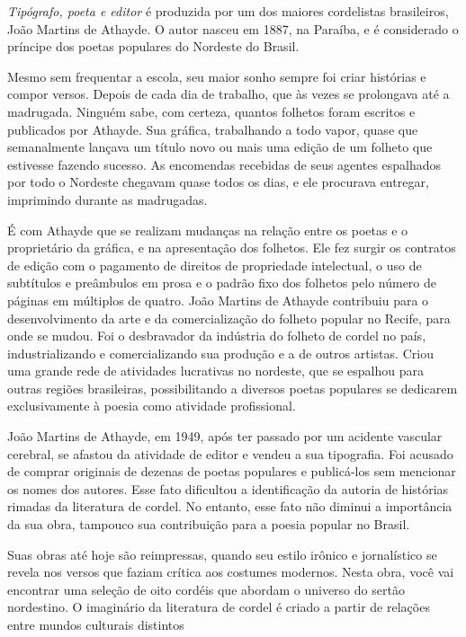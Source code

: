 \documentclass[12pt]{extarticle}
\begin{document}
\emph{Tipógrafo, poeta e editor} é produzida por 
um dos maiores cordelistas brasileiros, João Martins de Athayde. O autor nasceu em
1887, na Paraíba, e é considerado o príncipe dos poetas populares do Nordeste
do Brasil. 

Mesmo sem frequentar a escola, seu maior sonho sempre foi criar histórias
e compor versos. Depois de cada dia de trabalho, que às vezes se prolongava até
a madrugada. Ninguém sabe, com certeza, quantos folhetos foram escritos
e publicados por Athayde. Sua gráfica, trabalhando a todo vapor, quase que
semanalmente lançava um título novo ou mais uma edição de um folheto que
estivesse fazendo sucesso. As encomendas recebidas de seus agentes espalhados
por todo o Nordeste chegavam quase todos os dias, e ele procurava entregar,
imprimindo durante as madrugadas. 

É com Athayde que se realizam mudanças na relação entre os poetas
e o proprietário da gráfica, e na apresentação dos folhetos. Ele fez surgir os
contratos de edição com o pagamento de direitos de propriedade intelectual,
o uso de subtítulos e preâmbulos em prosa e o padrão fixo dos folhetos pelo
número de páginas em múltiplos de quatro. João Martins de Athayde contribuiu
para o desenvolvimento da arte e da comercialização do folheto popular no
Recife, para onde se mudou. Foi o desbravador da indústria do folheto de cordel
no país, industrializando e comercializando sua produção e a de outros
artistas. Criou uma grande rede de atividades lucrativas no nordeste, que se
espalhou para outras regiões brasileiras, possibilitando a diversos poetas
populares se dedicarem exclusivamente à poesia como atividade profissional. 

João Martins de Athayde, em 1949, após ter passado por um acidente vascular
cerebral, se afastou da atividade de editor e vendeu a sua tipografia. Foi
acusado de comprar originais de dezenas de poetas populares e publicá-los sem
mencionar os nomes dos autores. Esse fato dificultou a identificação da autoria
de histórias rimadas da literatura de cordel. No entanto, esse fato não diminui
a importância da sua obra, tampouco sua contribuição para a poesia popular no
Brasil.

Suas obras até hoje são reimpressas, quando seu estilo irônico e jornalístico
se revela nos versos que faziam crítica aos costumes modernos. Nesta obra, você
vai encontrar uma seleção de oito cordéis  que abordam o universo do sertão
nordestino. O imaginário da literatura de cordel é criado a partir de relações
entre mundos culturais distintos  
\end{document}
